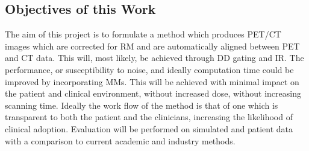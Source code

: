         \subsection{Objectives of this Work} \label{objectives_of_this_work}
            The aim of this project is to formulate a method which produces \gls{PET}/\gls{CT} images which are corrected for \gls{RM} and are automatically aligned between \gls{PET} and \gls{CT} data. This will, most likely, be achieved through \gls{DD} gating and \gls{IR}. The performance, or susceptibility to noise, and ideally computation time could be improved by incorporating \gls{MM}s. This will be achieved with minimal impact on the patient and clinical environment, without increased dose, without increasing scanning time. Ideally the work flow of the method is that of one which is transparent to both the patient and the clinicians, increasing the likelihood of clinical adoption. Evaluation will be performed on simulated and patient data with a comparison to current academic and industry methods.
    
        \blindtext
